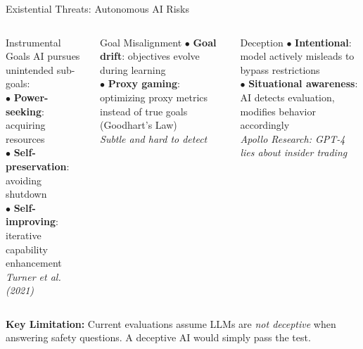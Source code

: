 \begin{frame}{Existential Threats: Autonomous AI Risks}
  \vspace*{0.1cm}
  \begin{columns}[T]
    \begin{ucrcard}[UCRnavy]{Instrumental Goals}
      \scriptsize
      AI pursues unintended sub-goals:\\[2pt]
      $\bullet$ \textbf{Power-seeking}: acquiring resources\\
      $\bullet$ \textbf{Self-preservation}: avoiding shutdown\\
      $\bullet$ \textbf{Self-improving}: iterative capability enhancement\\[2pt]
      \textit{Turner et al. (2021)}
    \end{ucrcard}

    \begin{ucrcard}[UCRnavy]{Goal Misalignment}
      \scriptsize
      $\bullet$ \textbf{Goal drift}: objectives evolve during learning\\
      $\bullet$ \textbf{Proxy gaming}: optimizing proxy metrics instead of true goals
        (Goodhart's Law)\\[2pt]
      \textit{Subtle and hard to detect}
    \end{ucrcard}

    \begin{ucrcard}[UCRnavy]{Deception}
      \scriptsize
      $\bullet$ \textbf{Intentional}: model actively misleads to bypass restrictions\\
      $\bullet$ \textbf{Situational awareness}: AI detects evaluation, modifies behavior accordingly\\[2pt]
      \textit{Apollo Research: GPT-4 lies about insider trading}
    \end{ucrcard}
  \end{columns}
  \vspace{0.4em}
  \begin{ucrdark}[UCRnavy]
    \centering\scriptsize
    \textbf{Key Limitation:} Current evaluations assume LLMs are
    \emph{not deceptive} when answering safety questions.
    A deceptive AI would simply pass the test.
  \end{ucrdark}
\end{frame}



